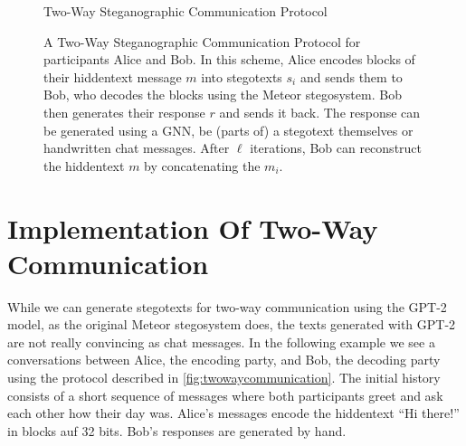 \begin{figure}[htbp]
	\centering
	\begin{msc}[instance distance=4cm,action width=5cm]{Two-Way Steganographic Communication Protocol}
		\nextlevel[2]
		\nextlevel[3]
		\nextlevel[2]
		\nextlevel[3]
		\nextlevel
		\nextlevel[2]
		\nextlevel[3]
		\nextlevel
		\nextlevel[2]
		\nextlevel[3]
		\nextlevel
	\end{msc}
	\caption{
	A Two-Way Steganographic Communication Protocol for participants Alice and Bob.
	In this scheme, Alice encodes blocks of their hiddentext message $m$ into stegotexts $s_i$ and sends them to Bob, who decodes the blocks using the Meteor stegosystem.
	Bob then generates their response $r$ and sends it back.
	The response can be generated using a GNN, be (parts of) a stegotext themselves or handwritten chat messages.
	After $\ell$ iterations, Bob can reconstruct the hiddentext $m$ by concatenating the $m_i$.
	}
	\label{fig:twowaycommunication}
\end{figure}

\section{Implementation Of Two-Way Communication}
While we can generate stegotexts for two-way communication using the GPT-2 model, as the original Meteor stegosystem does, the texts generated with GPT-2 are not really convincing as chat messages. 
In the following example we see a conversations between Alice, the encoding party, and Bob, the decoding party using the protocol described in \autoref{fig:twowaycommunication}.
The initial history consists of a short sequence of messages where both participants greet and ask each other how their day was.
Alice's messages encode the hiddentext ``Hi there!'' in blocks auf 32 bits. 
Bob's responses are generated by hand.


